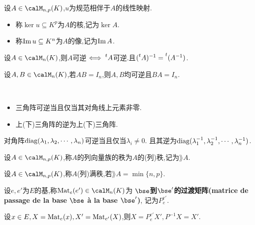 \begin{deff}
    设$A \in \calM_{n, p}(K)$,$u$为规范相伴于$A$的线性映射.
    \begin{itemize}
        \item 称$\ker u \subseteq K^p$为$A$的核,记为$\ker A$.
        \item 称$\operatorname{Im} u \subseteq K^n$为$A$的像,记为$\operatorname{Im} A$.
    \end{itemize}
\end{deff}

\begin{rqq}
    设$A \in \calM_n(K)$,则$A$可逆$\iff \prescript{t}{}{A}$可逆.且$(\prescript{t}{}{A})^{-1} = \prescript{t}{}{(A^{-1})}$.
\end{rqq}

\begin{prop}
    设$A, B \in \calM_n(K)$,若$AB = I_n$,则$A, B$均可逆且$BA = I_n$.
\end{prop}

\begin{prop} $\ $
    \begin{itemize}
        \item 三角阵可逆当且仅当其对角线上元素非零.
        \item 上(下)三角阵的逆为上(下)三角阵.
    \end{itemize}
\end{prop}

\begin{cor}
    对角阵$\operatorname{diag}(\lambda_1, \lambda_2, \cdots, \lambda_n)$可逆当且仅当$\lambda_i \neq 0$.
    且其逆为$\operatorname{diag}(\lambda_1^{-1}, \lambda_2^{-1}, \cdots, \lambda_n^{-1})$.
\end{cor}

\begin{deff}
    设$A \in \calM_{n, p}(K)$,称$A$的列向量族的秩为$A$的(列)秩,记为$\rang A$.
\end{deff}

\begin{deff}
    设$A \in \calM_{n, p}(K)$,称$A$(列)满秩,若$\rang A = \min \{ n, p \}$.
\end{deff}

\begin{deff}
    设$e, e'$为$E$的基,称$\mat_e(e') \in \calM_n(K)$为
    \textbf{$\bse$到$\bse'$的过渡矩阵(matrice de passage de la base $\bse$ à la base $\bse'$)},
    记为$P_e^{e'}$.
\end{deff}

\begin{prop}
    设$x \in E, X = \operatorname{Mat}_e(x), X' = \operatorname{Mat}_{e'}(X)$,则$X = P_e^{e'}X', P^{-1}X = X'$.
\end{prop}

